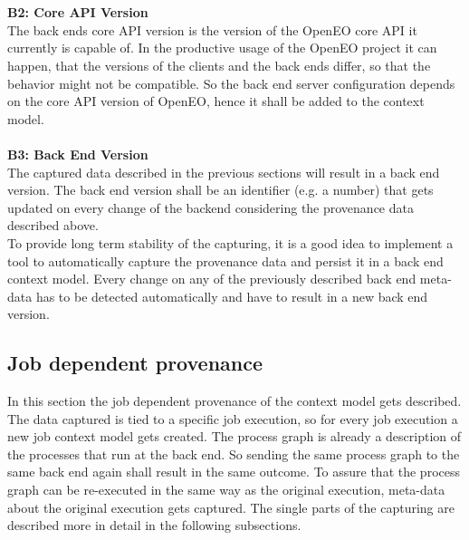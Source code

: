 \documentclass[draft,final]{vutinfth} %
\begin{document}
\\ \\
\textbf{B2: Core API Version} \\
The back ends core API version is the version of the OpenEO core API it currently is capable of. In the productive usage of the OpenEO project it can happen, that the versions of the clients and the back ends differ, so that the behavior might not be compatible. So the back end server configuration depends on the core API version of OpenEO, hence it shall be added to the context model.
\\ \\
\textbf{B3: Back End Version} \\
The captured data described in the previous sections will result in a back end version. The back end version shall be an identifier (e.g. a number) that gets updated on every change of the backend considering the provenance data described above. 
\\
To  provide long term stability of the capturing, it is a good idea to implement a tool to automatically capture the provenance data and persist it in a back end context model. Every change on any of the previously described back end meta-data has to be detected automatically and have to result in a new back end version.  


\subsection{Job dependent provenance}\label{Design:Job dependent provenance}
In this section the job dependent provenance of the context model gets described. The data captured is tied to a specific job execution, so for every job execution a new job context model gets created. The process graph is already a description of the processes that run at the back end. So sending the same process graph to the same back end again shall result in the same outcome. To assure that the process graph can be re-executed in the same way as the original execution, meta-data about the original execution gets captured. 
The single parts of the capturing are described more in detail in the following subsections. 
\end{document}

